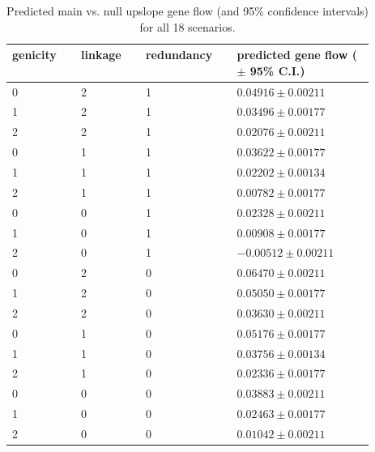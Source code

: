 \documentclass[9pt,twoside,lineno]{new_article}
\begin{document}
\begin{table}\centering
\caption{\label{tab:tab_s1}Predicted main vs. null upslope gene flow (and 95\% confidence intervals) for all 18 scenarios.}
\begin{tabular}{|b{0.1\linewidth}|b{0.1\linewidth}|b{0.1\linewidth}|b{0.22\linewidth}|}
\hline
\textbf{genicity} & \textbf{linkage} & \textbf{redundancy} & \textbf{predicted gene flow ($\pm$ 95\% C.I.)} \\
\hline
0 & 2 & 1 & $0.04916 \pm 0.00211$ \\
1 & 2 & 1 & $0.03496 \pm 0.00177$ \\
2 & 2 & 1 & $0.02076 \pm 0.00211$ \\
0 & 1 & 1 & $0.03622 \pm 0.00177$ \\
1 & 1 & 1 & $0.02202 \pm 0.00134$ \\
2 & 1 & 1 & $0.00782 \pm 0.00177$ \\
0 & 0 & 1 & $0.02328 \pm 0.00211$ \\
1 & 0 & 1 & $0.00908 \pm 0.00177$ \\
2 & 0 & 1 & $-0.00512 \pm 0.00211$ \\
0 & 2 & 0 & $0.06470 \pm 0.00211$ \\
1 & 2 & 0 & $0.05050 \pm 0.00177$ \\
2 & 2 & 0 & $0.03630 \pm 0.00211$ \\
0 & 1 & 0 & $0.05176 \pm 0.00177$ \\
1 & 1 & 0 & $0.03756 \pm 0.00134$ \\
2 & 1 & 0 & $0.02336 \pm 0.00177$ \\
0 & 0 & 0 & $0.03883 \pm 0.00211$ \\
1 & 0 & 0 & $0.02463 \pm 0.00177$ \\
2 & 0 & 0 & $0.01042 \pm 0.00211$ \\
\hline
\end{tabular}
\medskip
\end{table}



\FloatBarrier
\end{document}
